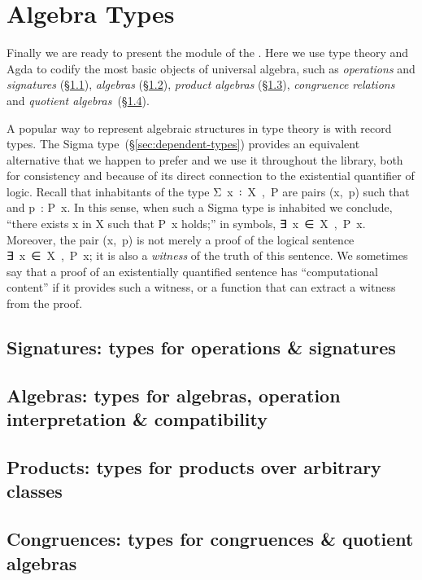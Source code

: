 \section{Algebra Types}\label{sec:algebra-types}
Finally we are ready to present the  module of the \agdaualib. Here we use type theory and Agda to codify the most basic objects of universal algebra, such as \emph{operations} and \emph{signatures} (\S\ref{sec:oper-sign}), \emph{algebras} (\S\ref{sec:algebras}), \emph{product algebras} (\S\ref{sec:product-algebras}), \emph{congruence relations} and \emph{quotient algebras}~(\S\ref{congruences}).

A popular way to represent algebraic structures in type theory is with record types. The Sigma type~(\S\ref{sec:dependent-types}) provides an equivalent alternative that we happen to prefer and we use it throughout the library, both for consistency and because of its direct connection to the existential quantifier of logic. Recall that inhabitants of the type \ad Σ~\ab x~\af ꞉~\ab X~\af ,~\ab P are pairs (\ab x,~\ab p) such that  and \ab p~\as : \ab P~\ab x. In this sense, when such a Sigma type is inhabited we conclude, ``there exists \ab x in \ab X such that \ab P~\ab x holds;'' in symbols, \as ∃~\ab x~\af ∈~\ab X~\af ,~\ab P~\ab x.  %
Moreover, the pair (\ab x,~\ab p) is not merely a proof of the logical sentence \as ∃~\ab x~\af ∈~\ab X~\af ,~\ab P~\ab x; it is also a \emph{witness} of the truth of this sentence. We sometimes say that a proof of an existentially quantified sentence has ``computational content'' if it provides such a witness, or a function that can extract a witness from the proof.

\subsection{Signatures: types for operations \& signatures}\label{sec:oper-sign}


\subsection{Algebras: types for algebras, operation interpretation \& compatibility}\label{sec:algebras}


\subsection{Products: types for products over arbitrary classes}\label{sec:product-algebras}


\subsection{Congruences: types for congruences \& quotient algebras}\label{congruences}

